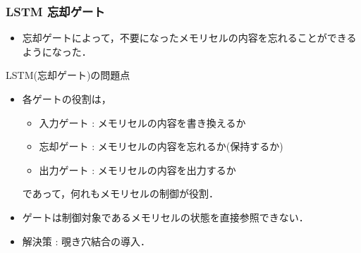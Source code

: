 \documentclass[dvipdfmx]{beamer}
\begin{document}
\begin{frame}
    \frametitle{LSTM \small{忘却ゲート}}
    \begin{itemize}
        \item 忘却ゲートによって，不要になったメモリセルの内容を忘れることができるようになった．
    \end{itemize}

    \vspace{\baselineskip}

    LSTM(忘却ゲート)の問題点
    \begin{itemize}
        \item 各ゲートの役割は，
            \begin{itemize}
                \item 入力ゲート : メモリセルの内容を書き換えるか
                \item 忘却ゲート : メモリセルの内容を忘れるか(保持するか)
                \item 出力ゲート : メモリセルの内容を出力するか
            \end{itemize}
        であって，何れもメモリセルの制御が役割．
        \item ゲートは制御対象であるメモリセルの状態を直接参照できない．
        \item 解決策 : 覗き穴結合の導入．
    \end{itemize}
\end{frame}
\end{document}
